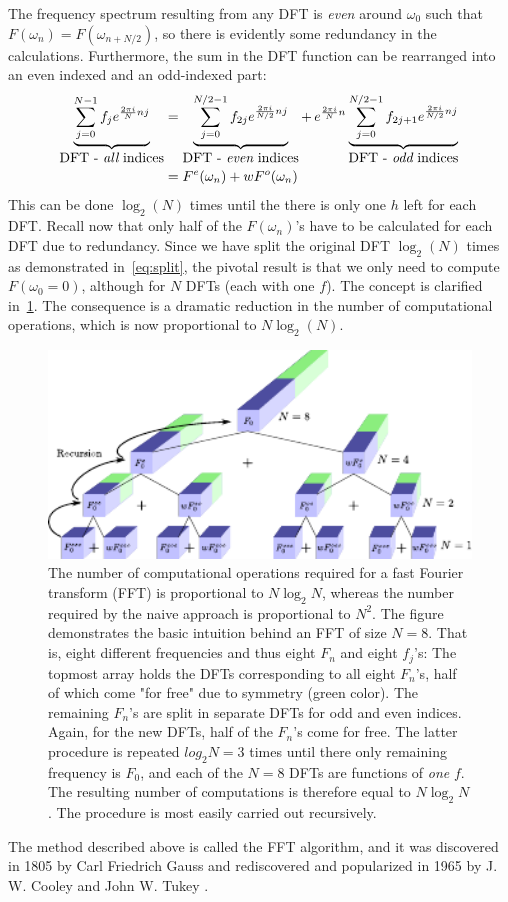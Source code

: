 \documentclass[10pt,twoside, b5paper,pdftex]{report}
\begin{document}
The  frequency spectrum resulting from any DFT is {\it even} around $\omega_{0}$ such that $F(\omega_{n}) = F(\omega_{n+N/2})$, so there is evidently some redundancy in the calculations. Furthermore, the sum in the DFT function can be rearranged into an even indexed and an odd-indexed part:
\begin{align}
	\underbrace{\sum^{N-1}_{j=0} f_{j} e^{\frac{2 \pi i}{N} n j}}_{\mbox{DFT - {\it all} indices}} &= \underbrace{\sum^{N/2-1}_{j=0} f_{2j} e^{\frac{2 \pi i}{N/2} n j}}_{\mbox{DFT - {\it even} indices}} +\, e^{\frac{2 \pi i}{N} n} \underbrace{\sum^{N/2-1}_{j=0} f_{2j+1} e^{\frac{2 \pi i}{N/2} n j}}_{\mbox{DFT - {\it odd} indices}} \\
	&= F^{e}(\omega_{n}) + w F^{o}(\omega_{n}) \label{eq:split}
\end{align}
This can be done $\log_2(N)$ times until the there is only one $h$ left for each DFT. Recall now that only half of the $F(\omega_{n})$'s have to be calculated for each DFT due to redundancy. Since we have split the original DFT $\log_2(N)$ times as demonstrated in~\cref{eq:split}, the pivotal result is that we only need to compute $F(\omega_{0}=0)$, although for $N$ DFTs (each with one $f$). The concept is clarified in~\cref{fig:magic}. The consequence is a dramatic reduction in the number of computational operations, which is now proportional to $N\log_2(N)$. 
\begin{figure}[htbp]
	\begin{center}
		\includegraphics[width=1.0\textwidth]{figures/magic.pdf}		
	\end{center}
	\caption{The number of computational operations required for a fast Fourier transform (FFT) is proportional to $N\log_{2}N$, whereas the number required by the naive approach is proportional to $N^2$. The figure demonstrates the basic intuition behind an FFT of size $N= 8$. That is, eight different frequencies and thus eight $F_n$ and eight $f_j$'s: The topmost array holds the DFTs corresponding to all eight $F_n$'s, half of which come "for free" due to symmetry (green color). The remaining $F_n$'s are split in separate DFTs for odd and even indices. Again, for the new DFTs, half of the $F_n$'s come for free. The latter procedure is repeated $log_{2}N = 3$ times until there only remaining frequency is $F_0$, and each of the $N=8$ DFTs are functions of {\it one} $f$. The resulting number of computations is therefore equal to $N\log_{2}N$. The procedure is most easily carried out recursively.   \label{fig:magic}}
\end{figure}
The method described above is called the FFT algorithm, and it was discovered in 1805 by Carl Friedrich Gauss and rediscovered and popularized in 1965 by J. W. Cooley and John W. Tukey \cite{COOLEY}. 
\end{document}
